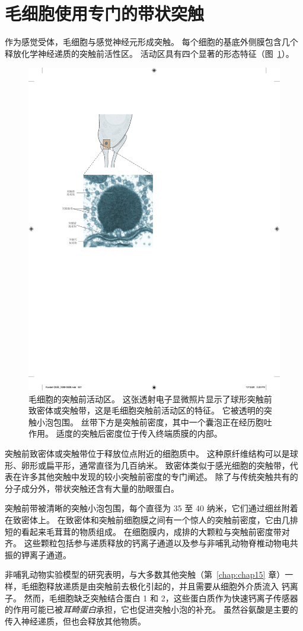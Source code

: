 \section{毛细胞使用专门的带状突触}

作为感觉受体，毛细胞与感觉神经元形成突触。
每个细胞的基底外侧膜包含几个释放化学神经递质的突触前活性区。
活动区具有四个显著的形态特征（图~\ref{fig:26_16}）。


\begin{figure}[htbp]
	\centering
	\includegraphics[width=0.65\linewidth]{chap26/fig_26_16}
	\caption{毛细胞的突触前活动区。
		这张透射电子显微照片显示了球形突触前致密体或突触带，这是毛细胞突触前活动区的特征。
		它被透明的突触小泡包围。
		丝带下方是突触前密度，其中一个囊泡正在经历胞吐作用。
		适度的突触后密度位于传入终端质膜的内部。 }
	\label{fig:26_16}
\end{figure}


突触前致密体或突触带位于释放位点附近的细胞质中。
这种原纤维结构可以是球形、卵形或扁平形，通常直径为几百纳米。
致密体类似于感光细胞的突触带，代表在许多其他突触中发现的较小突触前密度的专门阐述。
除了与传统突触共有的分子成分外，带状突触还含有大量的肋眼蛋白。


突触前带被清晰的突触小泡包围，每个直径为 35 至 40 纳米，它们通过细丝附着在致密体上。
在致密体和突触前细胞膜之间有一个惊人的突触前密度，它由几排短的看起来毛茸茸的物质组成。
在细胞膜内，成排的大颗粒与突触前密度带对齐。
这些颗粒包括参与递质释放的钙离子通道以及参与非哺乳动物脊椎动物电共振的钾离子通道。


非哺乳动物实验模型的研究表明，与大多数其他突触（第~\ref{chap:chap15} 章）一样，毛细胞释放递质是由突触前去极化引起的，并且需要从细胞外介质流入 钙离子。
然而，毛细胞缺乏突触结合蛋白 1 和 2，这些蛋白质作为快速钙离子传感器的作用可能已被\textit{耳畸蛋白}承担，它也促进突触小泡的补充。
虽然谷氨酸是主要的传入神经递质，但也会释放其他物质。



